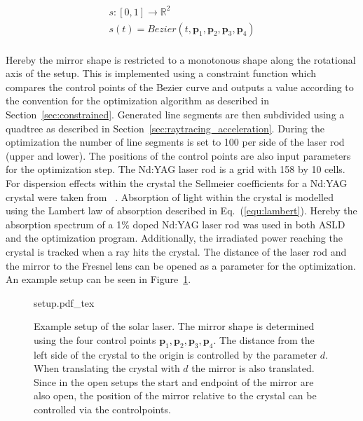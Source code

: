 \documentclass[a4paper,10pt]{article}
\renewcommand{\vec}[1]{\mathbf{#1}}
\newcommand{\equref}[1]{Eq.~(\ref{#1})}
\newcommand{\secref}[1]{Section~\ref{#1}}
\newcommand{\figref}[1]{Figure~\ref{#1}}
\begin{document}
    \begin{equation}
        \label{equ:mirror}
        \begin{gathered}
            s : [0,1] \rightarrow \mathbb{R}^2\\
            s(t) = Bezier(t, \vec{p}_1, \vec{p}_2, \vec{p}_3, \vec{p}_4)\\
        \end{gathered}
    \end{equation}

    Hereby the mirror shape is restricted to a monotonous shape
    along the rotational axis of the setup.
    This is implemented using a constraint function which compares
    the control points of the Bezier curve and outputs a 
    value according to the convention for the optimization algorithm as
    described in \secref{sec:constrained}.
    Generated line segments are then subdivided using a quadtree as described
    in \secref{sec:raytracing_acceleration}.
    During the optimization the number of line segments is set to 100
    per side of the laser rod (upper and lower).
    The positions of the control points are also input parameters
    for the optimization step.
    The Nd:YAG laser rod is a grid with 158 by 10 cells.
    For dispersion effects within the crystal the Sellmeier coefficients
    for a Nd:YAG crystal were taken from ~\cite{sellmeier_ndyag}.
    Absorption of light within the crystal is modelled using the Lambert
    law of absorption described in \equref{equ:lambert}.
    Hereby the absorption spectrum of a 1\% doped Nd:YAG laser
    rod was used in both ASLD and the optimization program.
    Additionally, the irradiated power reaching the crystal is
    tracked when a ray hits the crystal.
    The distance of the laser rod and the mirror to the
    Fresnel lens can be opened as a parameter for the optimization.
    An example setup can be seen in \figref{fig:setup_example}.

    \begin{figure}
        \centering
        {setup.pdf_tex}
        \label{fig:setup_example}
        \caption[Example setup of the solar laser]{Example setup of the solar laser. The mirror shape
        is determined using the four control points 
        $\vec{p}_1,\vec{p}_2,\vec{p}_3,\vec{p}_4$.
        The distance from the left side of the crystal to the origin
        is controlled by the parameter $d$.
        When translating the crystal with $d$ the mirror is also translated.
        Since in the open setups the start and endpoint of the mirror are
        also open, the position of the mirror relative to the crystal
        can be controlled via the controlpoints.}
    \end{figure}
\end{document}
